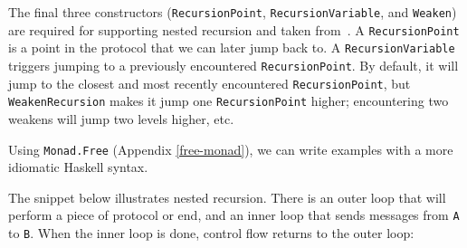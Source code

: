 \documentclass[runningheads,plain]{llncs}
\newenvironment{Shaded}{}{}
\newcommand{\KeywordTok}[1]{\textcolor[rgb]{0.00,0.44,0.13}{\textbf{#1}}}
\newcommand{\DataTypeTok}[1]{\textcolor[rgb]{0.56,0.13,0.00}{#1}}
\newcommand{\StringTok}[1]{\textcolor[rgb]{0.25,0.44,0.63}{#1}}
\newcommand{\CommentTok}[1]{\textcolor[rgb]{0.38,0.63,0.69}{\textit{#1}}}
\newcommand{\FunctionTok}[1]{\textcolor[rgb]{0.02,0.16,0.49}{#1}}
\newcommand{\NormalTok}[1]{#1}
\begin{document}

\noindent The final three constructors (\texttt{RecursionPoint}, \texttt{RecursionVariable}, and \texttt{Weaken}) are required for supporting nested
recursion and taken from~\cite{van2017session}. A
\texttt{RecursionPoint} is a point in the protocol that we can later
jump back to. A \texttt{RecursionVariable} triggers jumping to a
previously encountered \texttt{RecursionPoint}. By default, it will jump
to the closest and most recently encountered \texttt{RecursionPoint},
but \texttt{WeakenRecursion} makes it jump one \texttt{RecursionPoint}
higher; encountering two weakens will jump two levels higher, etc.

Using \texttt{Monad.Free} (Appendix \ref{free-monad}), we can write
examples with a more idiomatic Haskell syntax.

\begin{example}
The snippet below illustrates nested recursion. There is an outer
loop that will perform a piece of protocol or end, and an inner loop
that sends messages from \texttt{A} to \texttt{B}. When the inner loop
is done, control flow returns to the outer loop:

\begin{Shaded}
\end{Shaded}
\end{example}
\end{document}
